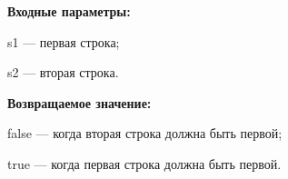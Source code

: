 \textbf{Входные параметры:}

     s1 --- первая строка;
	 
     s2 --- вторая строка.

\textbf{Возвращаемое значение:}
 
false --- когда вторая строка должна быть первой;

true --- когда первая строка должна быть первой.